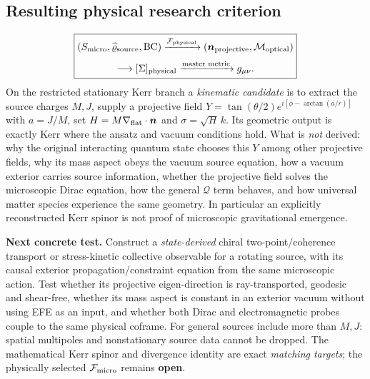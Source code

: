 \documentclass[11pt,a4paper]{article}
\begin{document}
\subsection{Resulting physical research criterion}
\begin{equation}\label{eq:v12-operational}
\boxed{\begin{gathered}
(S_{\rm micro},\widehat\varrho_{\rm source},\mathrm{BC})
\xrightarrow{\mathcal F_{\rm physical}}
(\boldsymbol n_{\rm projective},\mathcal M_{\rm optical})\\[3pt]
\longrightarrow[\Sigma]_{\rm physical}
\xrightarrow{\text{master metric}}g_{\mu\nu}.
\end{gathered}}
\end{equation}
On the restricted stationary Kerr branch a \emph{kinematic candidate} is to extract the source charges $M,J$, supply a projective field $Y=\tan(\theta/2)e^{i[\phi-\arctan(a/r)]}$ with $a=J/M$, set $H=M\nabla_{\rm flat}\cdot\boldsymbol n$ and $\sigma=\sqrt H\,k$. Its geometric output is exactly Kerr where the ansatz and vacuum conditions hold. What is \emph{not} derived: why the original interacting quantum state chooses this $Y$ among other projective fields, why its mass aspect obeys the vacuum source equation, how a vacuum exterior carries source information, whether the projective field solves the microscopic Dirac equation, how the general $\mathcal Q$ term behaves, and how universal matter species experience the same geometry. In particular an explicitly reconstructed Kerr spinor is not proof of microscopic gravitational emergence.

\textbf{Next concrete test.} Construct a \emph{state-derived} chiral two-point/coherence transport or stress-kinetic collective observable for a rotating source, with its causal exterior propagation/constraint equation from the same microscopic action. Test whether its projective eigen-direction is ray-transported, geodesic and shear-free, whether its mass aspect is constant in an exterior vacuum without using EFE as an input, and whether both Dirac and electromagnetic probes couple to the same physical coframe. For general sources include more than $M,J$: spatial multipoles and nonstationary source data cannot be dropped. The mathematical Kerr spinor and divergence identity are exact \emph{matching targets}; the physically selected $\mathcal F_{\rm micro}$ remains \textbf{open}.
\end{document}
